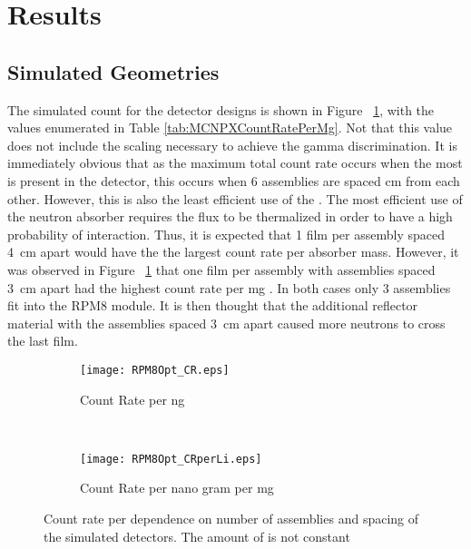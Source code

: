 \section{Results}
\label{sec:Results}

\subsection{Simulated Geometries}

The simulated count for the detector designs is shown in Figure ~\ref{fig:SimCountRate}, with the values enumerated in Table \ref{tab:MCNPXCountRatePerMg}.
Not that this value does not include the scaling necessary to achieve the gamma discrimination. 
It is immediately obvious that as the maximum total count rate occurs when the most  is present in the detector, this occurs when 6 assemblies are spaced \si{\centi\meter} from each other.
However, this is also the least efficient use of the .
The most efficient use of the neutron absorber requires the flux to be thermalized in order to have a high probability of interaction.
Thus, it is expected that 1 film per assembly spaced \SI{4}{\centi\meter} apart would have the the largest count rate per absorber mass.
However, it was observed in Figure ~\ref{fig:SimCountRate} that one film per assembly with assemblies spaced \SI{3}{\centi\meter} apart had the highest count rate per \si{\milli\gram} .
In both cases only 3 assemblies fit into the RPM8 module.
It is then thought that the additional reflector material with the assemblies spaced \SI{3}{\centi\meter} apart caused more neutrons to cross the last film.
\begin{figure}
    \centering
    \begin{subfigure}[b]{0.45\textwidth}
        \texttt{[image: RPM8Opt\_CR.eps]}
        \caption{Count Rate per \si{\nano\gram{}}}
    \end{subfigure}%
    ~
    \begin{subfigure}[b]{0.45\textwidth}
        \texttt{[image: RPM8Opt\_CRperLi.eps]}
        \caption{Count Rate per nano gram  per \si{\milli\gram} }
    \end{subfigure}
    \caption{Count rate per dependence on number of assemblies and spacing of the simulated detectors. The amount of  is not constant}
    \label{fig:SimCountRate}
\end{figure}
\begin{table}
  \caption{Count Rate per nano gram  per \si{\milli\gram}  for the MCNPX simulated geometries}
	\label{tab:MCNPXCountRatePerMg}
  \centering
	
\end{table}


